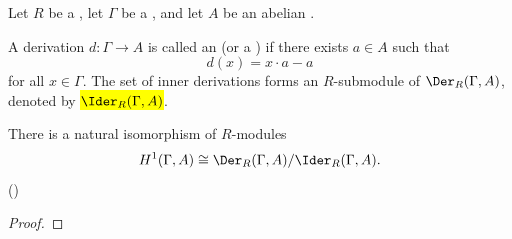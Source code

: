\begin{corollary} \label{corollary:first_cohomology_of_a_group_module_over_a_ring_is_quotient_of_derivations_by_inner_derivations}
    Let $R$ be a , let $\Gamma$ be a , and let $A$ be an abelian .

    A derivation $d: \Gamma \to A$ is called an  (or a ) if there exists $a \in A$ such that
    $$d(x) = x \cdot a - a$$
    for all $x \in \Gamma$. The set of inner derivations forms an $R$-submodule of $\Der_R(\Gamma, A)$, denoted by \hl{$\Ider_R(\Gamma, A)$}.

    There is a natural isomorphism of $R$-modules
    $$H^1(\Gamma, A) \cong \Der_R(\Gamma, A) / \Ider_R(\Gamma, A).$$
    ()
\end{corollary}
\begin{proof}
    \TODO{}
\end{proof}
